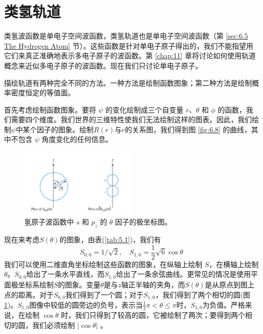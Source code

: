 \section{类氢轨道}
\label{sec:6.7 Hydrogenlike orbitals}
    类氢波函数是单电子空间波函数，类氢轨道也是单电子空间波函数（第 \ref{sec:6.5 The Hydrogen Atom} 节）。这些函数是针对单电子原子得出的，我们不能指望用它们来真正准确地表示多电子原子的波函数。第 \ref{chap:11} 章将讨论如何使用轨道概念来近似多电子原子的波函数。现在我们只讨论单电子原子。

    描绘轨道有两种完全不同的方法。一种方法是绘制函数图象；第二种方法是绘制概率密度恒定的等值面。

    首先考虑绘制函数图象。要将 $\psi$ 的变化绘制成三个自变量 $r$、$\theta$ 和 $\phi$ 的函数，我们需要四个维度。我们世界的三维特性使我们无法绘制这样的图表。因此，我们绘制$\psi$中某个因子的图象。绘制$R\left(r\right)$与$r$的关系图，我们得到图 \ref{fig:6.8} 的曲线，其中不包含 $\psi$ 角度变化的任何信息。
    \begin{figure}[h!]
        \centering
        \includegraphics[width=0.5\textwidth]{Figures/6.10.png}
        \caption{氢原子波函数中 $s$ 和 $p_z$ 的 $\theta$ 因子的极坐标图。}
        \label{fig:6.10}
    \end{figure}

    现在来考虑$S\left(\theta\right)$的图象，由表(\ref{tab:5.1})，我们有
    \begin{equation*}
        S_{0,0} = 1/\sqrt{2}, \quad S_{1,0} = \frac{1}{2}\sqrt{6}\cos\theta
    \end{equation*}
    我们可以使用二维直角坐标绘制这些函数的图象，在纵轴上绘制 $S$，在横轴上绘制 $\theta$。$S_{0,0}$给出了一条水平直线，而$S_{1,0}$给出了一条余弦曲线。更常见的情况是使用平面极坐标系绘制$S$的图象。变量$\theta$是与$z$轴正半轴的夹角，而$S\left(\theta\right)$是从原点到图上点的距离。对于$S_{0,0}$我们得到了一个圆；对于$S_{1,0}$，我们得到了两个相切的圆(图\ref{fig:6.10})。$S_{1,0}$图像中较低的圆旁边的负号，表示当$\frac{1}{2}\pi < \theta \leq \pi$时，$S_{1,0}$为负值。严格来说，在绘制 $\cos\theta$ 时，我们只得到了较高的圆，它被绘制了两次；要得到两个相切的圆，我们必须绘制 $\left|\cos\theta\right|$ 。

